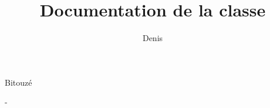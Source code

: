 \title[Documentation of the class \texorpdfstring{\yat}{yathesis}]{%
  Documentation de la classe \texorpdfstring{\yat}{yathesis}%
}
%
\subtitle[\version{\yathesisversion}]{\version{\yathesisversion}}
%
\author[denis.bitouze@univ-littoral.fr]{Denis}{Bitouzé}
%
\subject[LaTeX class whose basic purpose is to facilitate dissertations'
typesetting of theses prepared in France]{Classe LaTeX destinée à faciliter la
  rédaction des mémoires de thèses préparées en France}
%
%
\def\mysplit#1-#2-#3-{\def\myyear{#1}\def\mymonth{#2}\def\myday{#3}}
\def\splitdate#1{\expandafter\mysplit#1-}
\splitdate{\yathesisdate}

\date{\myday}{\mymonth}{\myyear}%
%
\maketitle[nofrontcover,frametitle={drop lifted shadow}]

